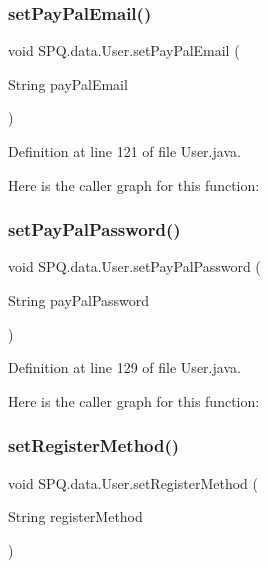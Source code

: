 \subsubsection{\texorpdfstring{set\+Pay\+Pal\+Email()}{setPayPalEmail()}}
{\footnotesize\ttfamily void S\+P\+Q.\+data.\+User.\+set\+Pay\+Pal\+Email (\begin{DoxyParamCaption}\item[{String}]{pay\+Pal\+Email }\end{DoxyParamCaption})}



Definition at line 121 of file User.\+java.

Here is the caller graph for this function\+:
\mbox{\label{class_s_p_q_1_1data_1_1_user_a61ca04ab3f3c854aa272f3097b355eb9}} 
\subsubsection{\texorpdfstring{set\+Pay\+Pal\+Password()}{setPayPalPassword()}}
{\footnotesize\ttfamily void S\+P\+Q.\+data.\+User.\+set\+Pay\+Pal\+Password (\begin{DoxyParamCaption}\item[{String}]{pay\+Pal\+Password }\end{DoxyParamCaption})}



Definition at line 129 of file User.\+java.

Here is the caller graph for this function\+:
\mbox{\label{class_s_p_q_1_1data_1_1_user_a6519805f5204c8d1add91a917634f588}} 
\subsubsection{\texorpdfstring{set\+Register\+Method()}{setRegisterMethod()}}
{\footnotesize\ttfamily void S\+P\+Q.\+data.\+User.\+set\+Register\+Method (\begin{DoxyParamCaption}\item[{String}]{register\+Method }\end{DoxyParamCaption})}



